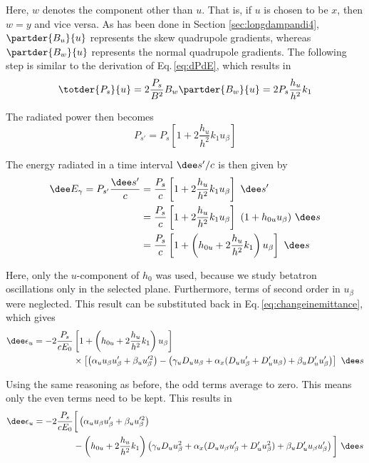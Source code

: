 Here, $w$ denotes the component other than $u$. That is, if $u$ is chosen to be $x$, then $w = y$ and vice versa. As has been done in Section \ref{sec:longdampandi4}, $\partder{B_u}{u}$ represents the skew quadrupole gradients, whereas $\partder{B_w}{u}$ represents the normal quadrupole gradients. The following step is similar to the derivation of Eq.\,\ref{eq:dPdE}, which results in
\begin{equation}
    \totder{P_s}{u} = 2 \frac{P_s}{B^2} B_w \partder{B_w}{u} = 2 P_s \frac{h_u}{h^2} k_1
\end{equation}

The radiated power then becomes
\begin{equation}
    P_{s'} = P_s \left[ 1 + 2 \frac{h_u}{h^2} k_1 u_\beta \right]
\end{equation}

The energy radiated in a time interval $\dee s' / c$ is then given by
\begin{align}
    \dee E_\gamma = P_{s'} \frac{\dee s'}{c} &= \frac{P_s}{c} \left[ 1 + 2 \frac{h_u}{h^2} k_1 u_\beta \right]\ \dee s' \notag\\
                                             &= \frac{P_s}{c} \left[ 1 + 2 \frac{h_u}{h^2} k_1 u_\beta \right]\ (1 + h_{0u} u_\beta)\ \dee s \notag\\
                                             &= \frac{P_s}{c} \left[ 1 + \left( h_{0u} + 2 \frac{h_u}{h^2} k_1 \right) u_\beta \right]\ \dee s
\end{align}

Here, only the $u$-component of $h_0$ was used, because we study betatron oscillations only in the selected plane. Furthermore, terms of second order in $u_\beta$ were neglected. This result can be substituted back in Eq.\,\ref{eq:changeinemittance}, which gives
\begin{align}
    \dee \epsilon_u = - 2 \frac{P_s}{cE_0} &\left[ 1 + \left( h_{0u} + 2 \frac{h_u}{h^2} k_1 \right) u_\beta \right]  \notag \\
                    & \times \left[ \left( \alpha_u u_\beta u_\beta' + \beta_u u_\beta'^2 \right)  - \left( \gamma_u D_u u_\beta + \alpha_x (D_u u_\beta' + D_u' u_\beta) + \beta_u D_u' u_\beta' \right)\right] \ \dee s
\end{align}

Using the same reasoning as before, the odd terms average to zero. This means only the even terms need to be kept. This results in
\begin{align}
    \dee \epsilon_u = - 2 \frac{P_s}{cE_0} &\bigg[ \left( \alpha_u u_\beta u_\beta' + \beta_u u_\beta'^2 \right) \notag\\
    &- \left( h_{0u} + 2 \frac{h_u}{h^2} k_1 \right) \left( \gamma_u D_u u_\beta^2 + \alpha_x (D_u u_\beta u_\beta' + D_u' u_\beta^2) + \beta_u D_u' u_\beta u_\beta' \right) \bigg]\ \dee s
\end{align}

